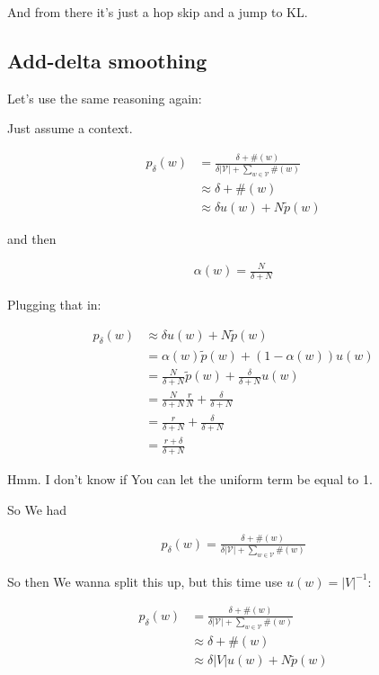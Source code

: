 \documentclass{article}
\begin{document}
	And from there it's just a hop skip and a jump to KL.
	    
	\newpage		
	\subsection{Add-delta smoothing}
	
		Let's use the same reasoning again:
		
		Just assume a context.
		
		\begin{align}
			p_\delta(w) &= \frac{\delta + \#(w)}{\delta |\mathcal{V}| + \sum_{w\in\mathcal{V}} \#(w)}\\
			&\approx \delta + \#(w)\\
			&\approx \delta u(w) + N\tilde{p}(w)
		\end{align}
		
		and then
		
		\begin{align}
			\alpha(w) = \frac{N}{\delta+N}
		\end{align}
		
		Plugging that in:
		
		\begin{align}
			p_\delta(w) &\approx \delta u(w) + N\tilde{p}(w)\\
			&= \alpha(w) \tilde{p}(w) + (1-\alpha(w)) u(w)  \\
			&= \frac{N}{\delta+N} \tilde{p}(w) + \frac{\delta}{\delta+N} u(w)\\
			&= \frac{N}{\delta+N} \frac{r}{N} + \frac{\delta}{\delta+N}\\
			&= \frac{r}{\delta+N} + \frac{\delta}{\delta+N}\\
			&= \frac{r+\delta}{\delta+N}
		\end{align}
		
		Hmm. I don't know if You can let the uniform term be equal to 1.
		
		So We had
		
		\begin{align}
			p_\delta(w) = \frac{\delta + \#(w)}{\delta |\mathcal{V}| + \sum_{w\in\mathcal{V}} \#(w)}
		\end{align}
		
		So then We wanna split this up, but this time use $u(w)=|V|^{-1}$:
		
		\begin{align}
			p_\delta(w) &= \frac{\delta + \#(w)}{\delta |\mathcal{V}| + \sum_{w\in\mathcal{V}} \#(w)}\\
			&\approx \delta + \#(w)\\
			&\approx \delta|V|u(w) + N\tilde{p}(w)
		\end{align}
		
\end{document}
